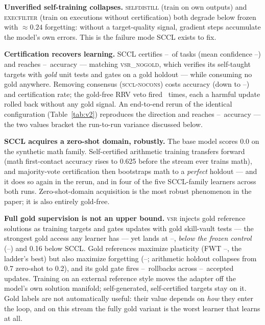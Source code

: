 \documentclass[10pt,conference]{IEEEtran}
\newcommand{\frozenacc}{--}\newcommand{\frozenbwt}{--}\newcommand{\frozenfwt}{--}%
\newcommand{\scclnoconsacc}{--}\newcommand{\scclnoconsbwt}{--}\newcommand{\scclnoconsfwt}{--}%
\newcommand{\scclacc}{--}\newcommand{\scclbwt}{--}\newcommand{\scclfwt}{--}%
\newcommand{\scclcertrate}{--}\newcommand{\scclmeanconf}{--}\newcommand{\scclgoldagree}{--}%
\newcommand{\vsracc}{--}\newcommand{\vsrbwt}{--}\newcommand{\vsrfwt}{--}%
\newcommand{\vsrforget}{--}\newcommand{\vsrupdates}{--}\newcommand{\vsrrollbacks}{--}\newcommand{\vsrfrontier}{--}%
\newcommand{\vtwoscclacc}{--}\newcommand{\vtwoscclbwt}{--}\newcommand{\vtwoscclforget}{--}\newcommand{\vtwoscclfrontier}{--}%
\begin{document}
\textbf{Unverified self-training collapses.} \textsc{selfdistill} (train on own outputs) and \textsc{execfilter} (train on executions without certification) both degrade below frozen with $\approx 0.24$ forgetting: without a target-quality signal, gradient steps accumulate the model's own errors. This is the failure mode SCCL exists to fix.

\textbf{Certification recovers learning.} SCCL certifies \scclcertrate\ of tasks (mean confidence \scclmeanconf) and reaches \scclacc\ accuracy --- matching \textsc{vsr\_nogold}, which verifies its self-taught targets with \emph{gold} unit tests and gates on a gold holdout --- while consuming no gold anywhere. Removing consensus (\textsc{sccl-nocons}) costs accuracy (down to \scclnoconsacc) and certification rate; the gold-free RRV veto fired \scclrrvvetoes\ times, each a harmful update rolled back without any gold signal. An end-to-end rerun of the identical configuration (Table~\ref{tab:v2}) reproduces the direction and reaches \vtwoscclacc\ accuracy --- the two values bracket the run-to-run variance discussed below.

\textbf{SCCL acquires a zero-shot domain, robustly.} The base model scores 0.0 on the synthetic math family. Self-certified arithmetic training transfers forward (math first-contact accuracy rises to 0.625 before the stream ever trains math), and majority-vote certification then bootstraps math to a \emph{perfect} holdout --- and it does so again in the rerun, and in four of the five SCCL-family learners across both runs. Zero-shot-domain acquisition is the most robust phenomenon in the paper; it is also entirely gold-free.

\textbf{Full gold supervision is not an upper bound.} \textsc{vsr} injects gold reference solutions as training targets and gates updates with gold skill-vault tests --- the strongest gold access any learner has --- yet lands at \vsracc, \emph{below the frozen control} (\frozenacc) and 0.16 below SCCL. Gold references maximize plasticity (FWT \vsrfwt, the ladder's best) but also maximize forgetting (\vsrforget; arithmetic holdout collapses from 0.7 zero-shot to 0.2), and its gold gate fires \vsrrollbacks\ rollbacks across \vsrupdates\ accepted updates. Training on an external reference style moves the adapter off the model's own solution manifold; self-generated, self-certified targets stay on it. Gold labels are not automatically useful: their value depends on \emph{how} they enter the loop, and on this stream the fully gold variant is the worst learner that learns at all.
\end{document}
